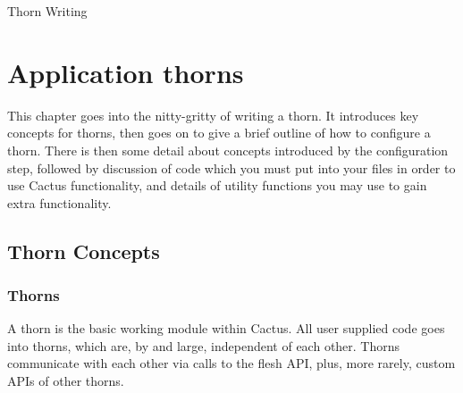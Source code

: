 
\begin{cactuspart}{Thorn Writing}
\renewcommand{\thepage}{\Alph{part}\arabic{page}}
\label{part:ThornWriting}

\chapter{Application thorns}


This chapter goes into the nitty-gritty of writing a thorn.
It introduces key concepts for thorns, then goes on to give
a brief outline of how to configure a thorn.
There is then some detail about concepts introduced by the configuration
step, followed by discussion of code which you must put into your files
in order to use Cactus functionality, and details of utility functions
you may use to gain extra functionality.


\section{Thorn Concepts}
\label{chap:thorn_concepts}


\subsection{Thorns}

A thorn is the basic working module within Cactus.  All user supplied
code goes into thorns, which are, by and large, independent of each other.
Thorns communicate with each other via calls to the flesh API, plus, more
rarely, custom APIs of other thorns.


\end{cactuspart}
